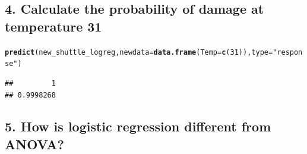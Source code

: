 \documentclass{article}\usepackage[]{graphicx}\usepackage[]{color}
\makeatletter
\newcommand{\hlnum}[1]{\textcolor[rgb]{0.686,0.059,0.569}{#1}}%
\newcommand{\hlstr}[1]{\textcolor[rgb]{0.192,0.494,0.8}{#1}}%
\newcommand{\hlstd}[1]{\textcolor[rgb]{0.345,0.345,0.345}{#1}}%
\newcommand{\hlkwc}[1]{\textcolor[rgb]{0.333,0.667,0.333}{#1}}%
\newcommand{\hlkwd}[1]{\textcolor[rgb]{0.737,0.353,0.396}{\textbf{#1}}}%
\newenvironment{kframe}{%
 \def\at@end@of@kframe{}%
 \ifinner\ifhmode%
  \def\at@end@of@kframe{\end{minipage}}%
  \begin{minipage}{\columnwidth}%
 \fi\fi%
 \def\FrameCommand##1{\hskip\@totalleftmargin \hskip-\fboxsep
 \colorbox{shadecolor}{##1}\hskip-\fboxsep
     \hskip-\linewidth \hskip-\@totalleftmargin \hskip\columnwidth}%
 \MakeFramed {\advance\hsize-\width
   \@totalleftmargin\z@ \linewidth\hsize
   \@setminipage}}%
 {\par\unskip\endMakeFramed%
 \at@end@of@kframe}
\newenvironment{knitrout}{}{} %
\makeatother
\begin{document}
\subsection*{4. Calculate the probability of damage at temperature 31}

\begin{knitrout}
\color{fgcolor}\begin{kframe}
\begin{alltt}
\hlkwd{predict}\hlstd{(new_shuttle_logreg,} \hlkwc{newdata} \hlstd{=} \hlkwd{data.frame}\hlstd{(}\hlkwc{Temp} \hlstd{=} \hlkwd{c}\hlstd{(}\hlnum{31}\hlstd{)),} \hlkwc{type} \hlstd{=} \hlstr{"response"}\hlstd{)}
\end{alltt}
\begin{verbatim}
##         1 
## 0.9998268
\end{verbatim}
\end{kframe}
\end{knitrout}

\subsection*{5. How is logistic regression different from ANOVA?}
\end{document}
